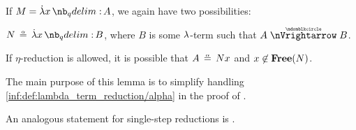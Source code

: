 \begin{lemma}
\begin{thmenum}
     If \( M = \qabs x A \), we again have two possibilities:
    \begin{thmenum}
       \( N \aequiv \qabs x B \), where \( B \) is some \( {\mathrm \lambda} \)-term such that \( A \ppred B \).

       If \( \eta \)-reduction is allowed, it is possible that \( A \aequiv Nx \) and \( x \not\in \op*{Free}(N) \).
    \end{thmenum}
  \end{thmenum}
\end{lemma}
\begin{comments}
  \item The main purpose of this lemma is to simplify handling \ref{inf:def:lambda_term_reduction/alpha} in the proof of .

  \item An analogous statement for single-step reductions is .
\end{comments}
